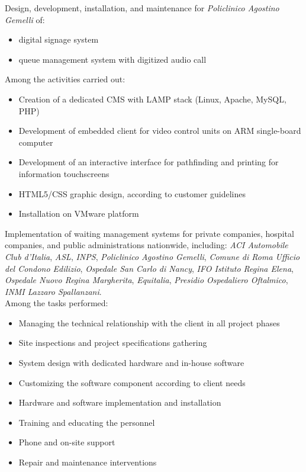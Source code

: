 \vspace{3mm}
        {Design, development, installation, and maintenance for \emph{Policlinico Agostino Gemelli} of:
          \begin{itemize}
          \item digital signage system
          \item queue management system with digitized audio call
          \end{itemize}
          Among the activities carried out:
          \begin{itemize}
          \item Creation of a dedicated CMS with LAMP stack (Linux, Apache, MySQL, PHP)
          \item Development of embedded client for video control units on ARM single-board computer
          \item Development of an interactive interface for pathfinding and printing for information touchscreens
          \item HTML5/CSS graphic design, according to customer guidelines
          \item Installation on VMware platform
          \end{itemize}}
\vspace{3mm}
        {Implementation of waiting management systems for private companies, hospital companies, and public administrations nationwide, including: \emph{ACI Automobile Club d'Italia}, \emph{ASL}, \emph{INPS}, \emph{Policlinico Agostino Gemelli}, \emph{Comune di Roma Ufficio del Condono Edilizio}, \emph{Ospedale San Carlo di Nancy}, \emph{IFO Istituto Regina Elena}, \emph{Ospedale Nuovo Regina Margherita}, \emph{Equitalia}, \emph{Presidio Ospedaliero Oftalmico}, \emph{INMI Lazzaro Spallanzani}.\\ Among the tasks performed:
          \begin{itemize}
          \item Managing the technical relationship with the client in all project phases
          \item Site inspections and project specifications gathering
          \item System design with dedicated hardware and in-house software
          \item Customizing the software component according to client needs
          \item Hardware and software implementation and installation
          \item Training and educating the personnel
          \item Phone and on-site support
          \item Repair and maintenance interventions
          \end{itemize}}
